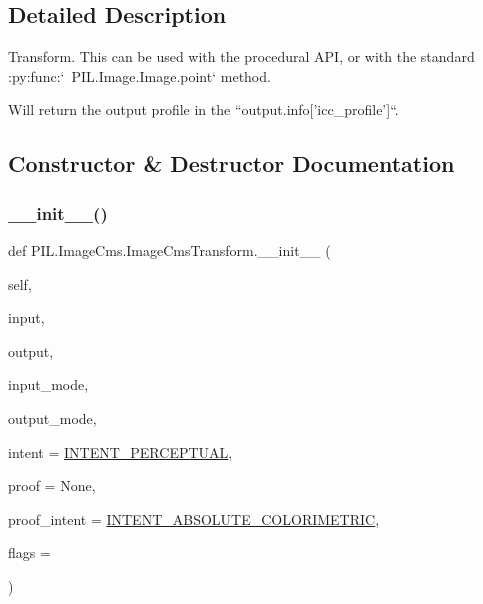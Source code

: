 \subsection{Detailed Description}
\begin{DoxyVerb}Transform.  This can be used with the procedural API, or with the standard
:py:func:`~PIL.Image.Image.point` method.

Will return the output profile in the ``output.info['icc_profile']``.
\end{DoxyVerb}
 

\subsection{Constructor \& Destructor Documentation}
\mbox{\label{classPIL_1_1ImageCms_1_1ImageCmsTransform_ad04e6f752e3f0a18f7ff51bf6fde21df}} 
\subsubsection{\texorpdfstring{\+\_\+\+\_\+init\+\_\+\+\_\+()}{\_\_init\_\_()}}
{\footnotesize\ttfamily def P\+I\+L.\+Image\+Cms.\+Image\+Cms\+Transform.\+\_\+\+\_\+init\+\_\+\+\_\+ (\begin{DoxyParamCaption}\item[{}]{self,  }\item[{}]{input,  }\item[{}]{output,  }\item[{}]{input\+\_\+mode,  }\item[{}]{output\+\_\+mode,  }\item[{}]{intent = {\ttfamily \hyperlink{namespacePIL_1_1ImageCms_a5ede11c95f67c7ea71b86e9a9e8a4f87}{I\+N\+T\+E\+N\+T\+\_\+\+P\+E\+R\+C\+E\+P\+T\+U\+AL}},  }\item[{}]{proof = {\ttfamily None},  }\item[{}]{proof\+\_\+intent = {\ttfamily \hyperlink{namespacePIL_1_1ImageCms_a6704a2c2d4e948b9d74a12a567f68b9e}{I\+N\+T\+E\+N\+T\+\_\+\+A\+B\+S\+O\+L\+U\+T\+E\+\_\+\+C\+O\+L\+O\+R\+I\+M\+E\+T\+R\+IC}},  }\item[{}]{flags = {} }\end{DoxyParamCaption})}




